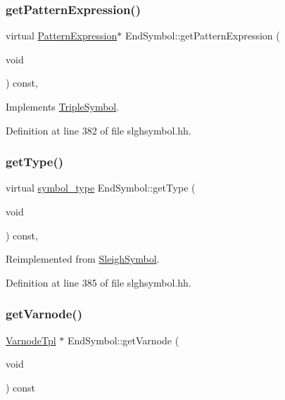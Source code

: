 \subsubsection{\texorpdfstring{getPatternExpression()}{getPatternExpression()}}
{\footnotesize\ttfamily virtual \mbox{\hyperlink{class_pattern_expression}{Pattern\+Expression}}$\ast$ End\+Symbol\+::get\+Pattern\+Expression (\begin{DoxyParamCaption}\item[{void}]{ }\end{DoxyParamCaption}) const\hspace{0.3cm}{\ttfamily [inline]}, {\ttfamily [virtual]}}



Implements \mbox{\hyperlink{class_triple_symbol_a213895658c5fe547edf9ac54a1d2de2e}{Triple\+Symbol}}.



Definition at line 382 of file slghsymbol.\+hh.

\mbox{\label{class_end_symbol_a0eef9ec04d733bbbb18ddf0c72e1ed9b}} 
\subsubsection{\texorpdfstring{getType()}{getType()}}
{\footnotesize\ttfamily virtual \mbox{\hyperlink{class_sleigh_symbol_aba70f7f332fd63488c5ec4bd7807db41}{symbol\+\_\+type}} End\+Symbol\+::get\+Type (\begin{DoxyParamCaption}\item[{void}]{ }\end{DoxyParamCaption}) const\hspace{0.3cm}{\ttfamily [inline]}, {\ttfamily [virtual]}}



Reimplemented from \mbox{\hyperlink{class_sleigh_symbol_a2f6e5903e461084c29f95ea024883950}{Sleigh\+Symbol}}.



Definition at line 385 of file slghsymbol.\+hh.

\mbox{\label{class_end_symbol_a1d1cbb76194a73d62eed37ee0e182c8c}} 
\subsubsection{\texorpdfstring{getVarnode()}{getVarnode()}}
{\footnotesize\ttfamily \mbox{\hyperlink{class_varnode_tpl}{Varnode\+Tpl}} $\ast$ End\+Symbol\+::get\+Varnode (\begin{DoxyParamCaption}\item[{void}]{ }\end{DoxyParamCaption}) const\hspace{0.3cm}{\ttfamily [virtual]}}



